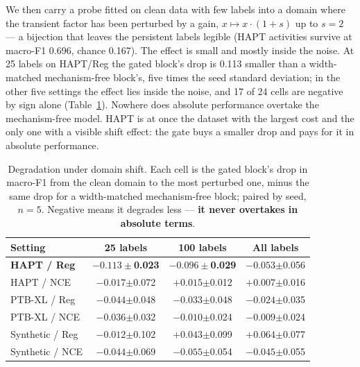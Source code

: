 We then carry a probe fitted on clean data with few labels into a domain where the transient factor has been perturbed by a gain, $x \mapsto x\cdot(1+s)$ up to $s=2$ --- a bijection that leaves the persistent labels legible (HAPT activities survive at macro-F1 0.696, chance 0.167). The effect is small and mostly inside the noise. At 25 labels on HAPT/Reg the gated block's drop is 0.113 smaller than a width-matched mechanism-free block's, five times the seed standard deviation; in the other five settings the effect lies inside the noise, and 17 of 24 cells are negative by sign alone (Table~\ref{tab:shift}). Nowhere does absolute performance overtake the mechanism-free model. HAPT is at once the dataset with the largest cost and the only one with a visible shift effect: the gate buys a smaller drop and pays for it in absolute performance.

\begin{table}[!htb]
\caption{Degradation under domain shift. Each cell is the gated block's drop in macro-F1 from the clean domain to the most perturbed one, minus the same drop for a width-matched mechanism-free block; paired by seed, $n=5$. Negative means it degrades less --- \textbf{it never overtakes in absolute terms}.}
\label{tab:shift}
\centering
\small
\begin{tabular}{lccc}
\hline
Setting & 25 labels & 100 labels & All labels \\
\hline
\textbf{HAPT / Reg} & $\mathbf{-0.113}\pm$\textbf{0.023} & $\mathbf{-0.096}\pm$\textbf{0.029} & $-0.053$$\pm$0.056 \\
HAPT / NCE & $-0.017$$\pm$0.072 & $+0.015$$\pm$0.012 & $+0.007$$\pm$0.016 \\
PTB-XL / Reg & $-0.044$$\pm$0.048 & $-0.033$$\pm$0.048 & $-0.024$$\pm$0.035 \\
PTB-XL / NCE & $-0.036$$\pm$0.032 & $-0.010$$\pm$0.024 & $-0.009$$\pm$0.024 \\
Synthetic / Reg & $-0.012$$\pm$0.102 & $+0.043$$\pm$0.099 & $+0.064$$\pm$0.077 \\
Synthetic / NCE & $-0.044$$\pm$0.069 & $-0.055$$\pm$0.054 & $-0.045$$\pm$0.055 \\
\hline
\end{tabular}
\end{table}
